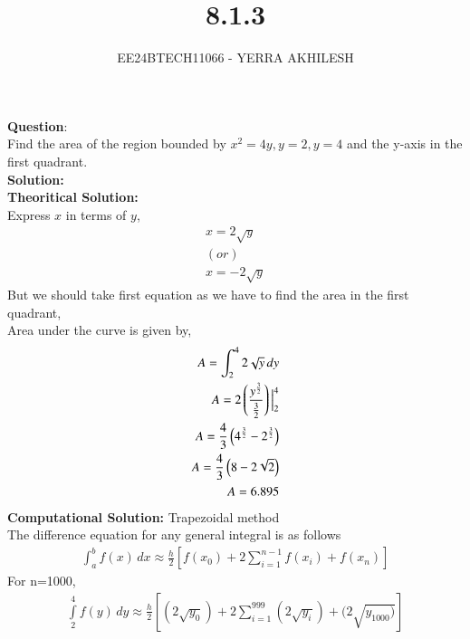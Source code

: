 \documentclass[journal]{IEEEtran}
\begin{document}

\vspace{3cm}

\title{8.1.3}
\author{EE24BTECH11066 - YERRA AKHILESH}
{\let\newpage\relax\maketitle}

\renewcommand{\thefigure}{\theenumi}
\renewcommand{\thetable}{\theenumi}
\setlength{\intextsep}{10pt} %

\renewcommand{\thetable}{\theenumi}
\textbf{Question}:\\
Find the area of the region bounded by $x^2 = 4y, y = 2, y = 4$ and the y-axis in the first quadrant.\\
\textbf{Solution: }\\
\textbf{Theoritical Solution:}\\
Express $x$ in terms of $y$,
\begin{align}
    x = 2 \sqrt{y}\\
    (or) \\
    x = -2 \sqrt{y}
\end{align}
But we should take first equation as we have to find the area in the first quadrant,\\
Area under the curve is given by,
\begin{align}
    A = \int_{2}^{4} 2 \sqrt{y} \, dy\\
    A = 2 \left(\frac{y^{\frac{3}{2}}}{\frac{3}{2}}\right) \Big|_2^4\\
    A = \frac{4}{3} \left(4^{\frac{3}{2}} - 2^{\frac{3}{2}}\right)\\
    A = \frac{4}{3} \left(8 - 2\sqrt{2}\right)\\
    A = 6.895
\end{align}
\textbf{Computational Solution:} Trapezoidal method\\
The difference equation for any general integral is as follows
\begin{align}    
\int_a^b f(x) \, dx \approx \frac{h}{2} \left[ f(x_0) + 2 \sum_{i=1}^{n-1} f(x_i) + f(x_n) \right]   
\end{align}
For n=1000,
\begin{align}    
\int\limits_2^4 f(y) \, dy \approx \frac{h}{2} \left[ (2\sqrt{y_0}) + 2 \sum_{i=1}^{999} (2\sqrt{y_i}) + (2\sqrt{y_{1000})} \right]   
\end{align}
\end{document}
